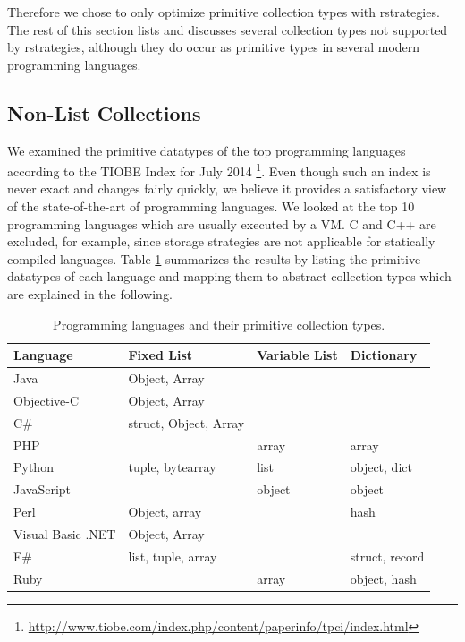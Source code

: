 Therefore we chose to only optimize primitive collection types with rstrategies.
The rest of this section lists and discusses several collection types not supported by rstrategies, although they do occur as primitive types in several modern programming languages.

\subsection{Non-List Collections}

We examined the primitive datatypes of the top programming languages according to the TIOBE Index for July 2014 \footnote{\url{http://www.tiobe.com/index.php/content/paperinfo/tpci/index.html}}.
Even though such an index is never exact and changes fairly quickly, we believe it provides a satisfactory view of the state-of-the-art of programming languages.
We looked at the top 10 programming languages which are usually executed by a VM.
C and C++ are excluded, for example, since storage strategies are not applicable for statically compiled languages.
Table \ref{tab:collectionTypes} summarizes the results by listing the primitive datatypes of each language and mapping them to abstract collection types which are explained in the following.

\begin{table}
\centering

\begin{tabular}[ht]{ l l l l }
\toprule
Language & Fixed List & Variable List & Dictionary \\
\midrule
Java & Object, Array & {} & {} \\
Objective-C & Object, Array & {} & {} \\
C\# & struct, Object, Array & {} & {} \\
PHP & {} & array & array \\
Python & tuple, bytearray & list & object, dict \\
JavaScript & {} & object & object \\
Perl & Object, array & {} & hash \\
Visual Basic .NET & Object, Array & {} & {} \\
F\# & list, tuple, array & {} & struct, record \\
Ruby & {} & array & object, hash \\
\bottomrule
\end{tabular}

\caption{Programming languages and their primitive collection types.}
\label{tab:collectionTypes}
\end{table}

